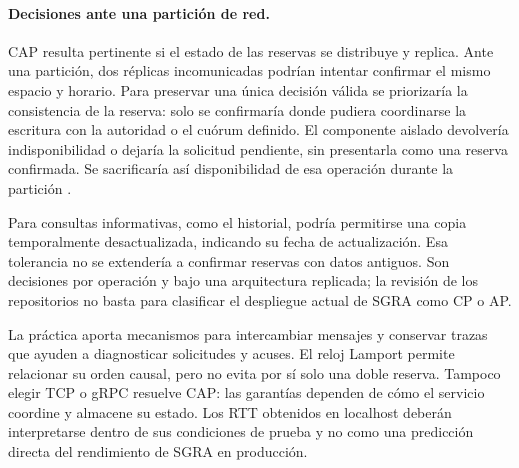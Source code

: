 \paragraph{Decisiones ante una partición de red.}
CAP resulta pertinente si el estado de las reservas se distribuye y replica.
Ante una partición, dos réplicas incomunicadas podrían intentar confirmar el
mismo espacio y horario. Para preservar una única decisión válida se priorizaría
la consistencia de la reserva: solo se confirmaría donde pudiera coordinarse
la escritura con la autoridad o el cuórum definido. El componente aislado
devolvería indisponibilidad o dejaría la solicitud pendiente, sin presentarla
como una reserva confirmada. Se sacrificaría así disponibilidad de esa operación
durante la partición \cite{belinda_lee2023_cap}.

Para consultas informativas, como el historial, podría permitirse una copia
temporalmente desactualizada, indicando su fecha de actualización. Esa tolerancia
no se extendería a confirmar reservas con datos antiguos. Son decisiones por
operación y bajo una arquitectura replicada; la revisión de los repositorios
no basta para clasificar el despliegue actual de SGRA como CP o AP.

La práctica aporta mecanismos para intercambiar mensajes y conservar trazas que
ayuden a diagnosticar solicitudes y acuses. El reloj Lamport permite relacionar
su orden causal, pero no evita por sí solo una doble reserva. Tampoco elegir TCP
o gRPC resuelve CAP: las garantías dependen de cómo el servicio coordine y
almacene su estado. Los RTT obtenidos en localhost deberán interpretarse dentro
de sus condiciones de prueba y no como una predicción directa del rendimiento
de SGRA en producción.
